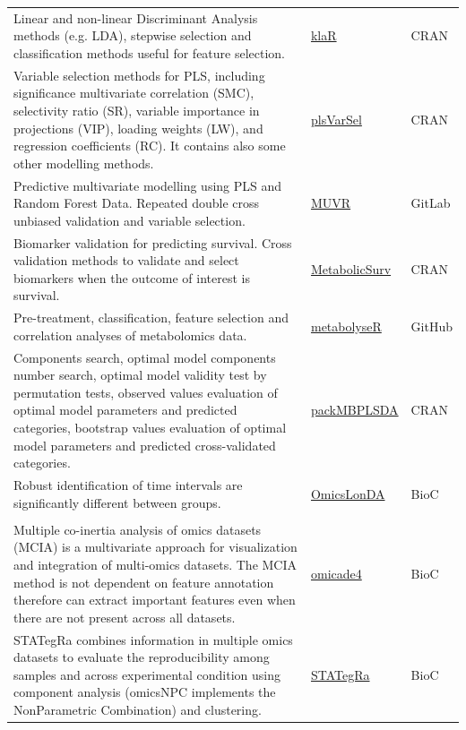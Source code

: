 \documentclass[]{article}
\begin{document}
\begin{longtable}{>{\raggedright\arraybackslash}p{30em}>{\raggedright\arraybackslash}p{10em}>{\raggedright\arraybackslash}p{3em}}
Linear and non-linear Discriminant Analysis methods (e.g. LDA), stepwise selection and classification methods useful for feature selection. & \href{https://cran.r-project.org/package=klaR}{klaR} & CRAN\\
\rowcolor{gray!6}  Variable selection methods for PLS, including significance multivariate correlation (SMC), selectivity ratio (SR), variable importance in projections (VIP), loading weights (LW), and regression coefficients (RC). It contains also some other modelling methods. & \href{https://cran.r-project.org/package=plsVarSel}{plsVarSel} & CRAN\\
Predictive multivariate modelling using PLS and Random Forest Data. Repeated double cross unbiased validation and variable selection. & \href{https://gitlab.com/CarlBrunius/MUVR}{MUVR} & GitLab\\
\rowcolor{gray!6}  Biomarker validation for predicting survival. Cross validation methods to validate and select biomarkers when the outcome of interest is survival. & \href{https://cran.r-project.org/package=MetabolicSurv}{MetabolicSurv} & CRAN\\
Pre-treatment, classification, feature selection and correlation analyses of metabolomics data. & \href{https://github.com/jasenfinch/metabolyseR}{metabolyseR} & GitHub\\
\rowcolor{gray!6}  Components search, optimal model components number search, optimal model validity test by permutation tests, observed values evaluation of optimal model parameters and predicted categories, bootstrap values evaluation of optimal model parameters and predicted cross-validated categories. & \href{https://cran.r-project.org/package=packMBPLSDA}{packMBPLSDA} & CRAN\\
Robust identification of time intervals are significantly different between groups. & \href{https://doi.org/doi:10.18129/B9.bioc.OmicsLonDA}{OmicsLonDA} & BioC\\
\rowcolor{gray!6}  \addlinespace[0.3em]
\multicolumn{3}{l}{\textbf{Omics Data integration}}\\
Multiple co-inertia analysis of omics datasets (MCIA) is a multivariate approach for visualization and integration of multi-omics datasets. The MCIA method is not dependent on feature annotation therefore can extract important features even when there are not present across all datasets. & \href{http://bioconductor.org/packages/release/bioc/html/omicade4.html}{omicade4} & BioC\\
STATegRa combines information in multiple omics datasets to evaluate the reproducibility among samples and across experimental condition using component analysis (omicsNPC implements the NonParametric Combination) and clustering. & \href{https://doi.org/doi:10.18129/B9.bioc.STATegRa}{STATegRa} & BioC\\

\end{longtable}
\end{document}
